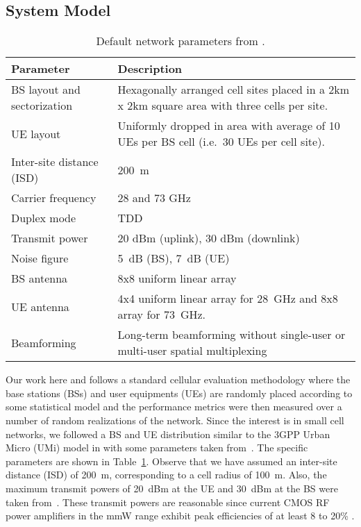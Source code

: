 \documentclass[journal]{IEEEtran}
\begin{document}
\subsection{System Model}
\begin{table}
\caption{Default network parameters from \cite{AkLiuRanRapEr:13-arxiv}.}
\label{table:para}
\hfill{}
 \begin{tabular}{|>{\raggedright}p{1.25in}|>{\raggedright}p{1.75in}|}
	\hline
	\textbf{Parameter}  &  \textbf{Description} \tabularnewline \hline
	BS layout and sectorization &
        Hexagonally arranged cell sites placed in a 2km x 2km square area
        with three cells per site. \tabularnewline \hline
	UE layout   &   Uniformly dropped in area with average of 10 UEs per
        BS cell (i.e.\ 30 UEs per cell site).
        \tabularnewline \hline
	Inter-site distance (ISD) &    200~m \tabularnewline \hline
    Carrier frequency & 28 and 73 GHz \tabularnewline \hline
    Duplex mode & TDD \tabularnewline \hline
	Transmit power  &  20 dBm (uplink), 30 dBm (downlink) \tabularnewline \hline
	Noise figure  &  5~dB (BS), 7~dB (UE) \tabularnewline \hline
    BS antenna & 8x8  uniform linear array \tabularnewline \hline
    UE antenna & 4x4  uniform linear array for 28~GHz and
          8x8 array for 73~GHz.  \tabularnewline \hline
    Beamforming & Long-term beamforming without single-user or multi-user
    spatial multiplexing \tabularnewline \hline
  \end{tabular}
\hfill{}
\end{table}


Our work here and \cite{AkLiuRanRapEr:13-arxiv} follows a
standard cellular evaluation methodology \cite{3GPP36.814}
where the base stations (BSs) and user equipments (UEs)
are randomly placed according to some statistical model and the performance
metrics were then measured over a number of random realizations of the network.
Since the interest is in small cell networks, we followed a BS and UE distribution
similar to the 3GPP Urban Micro (UMi) model in \cite{3GPP36.814} with some
parameters taken from~\cite{KhanPi:11,KhanPi:11-CommMag}.
The specific parameters are shown in Table~\ref{table:para}.
Observe that we have assumed an inter-site distance (ISD) of 200~m,
corresponding to a cell radius of 100~m.  Also,
the maximum transmit powers of 20~dBm at the UE and
30~dBm at the BS were taken from~\cite{KhanPi:11,KhanPi:11-CommMag}.  These transmit powers
are reasonable since current CMOS RF power amplifiers in the mmW range
exhibit peak efficiencies of at least 8 to 20\% \cite{Ted:60Gstate11,Z3,Z4}.
\end{document}
